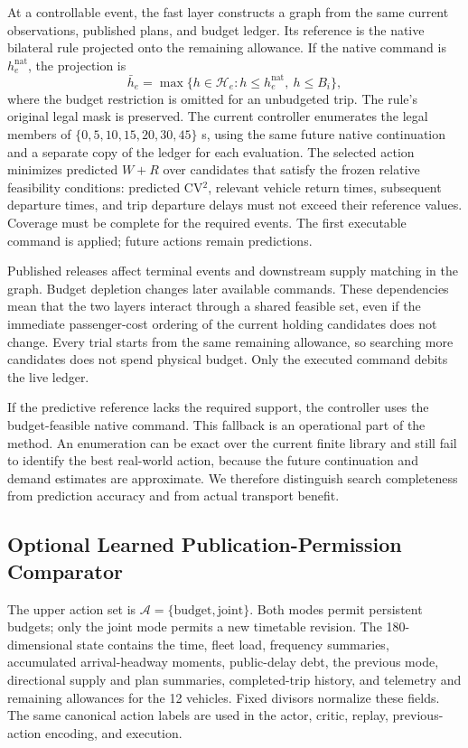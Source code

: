 At a controllable event, the fast layer constructs a graph from the same current observations, published plans, and budget ledger. Its reference is the native bilateral rule projected onto the remaining allowance. If the native command is $h_e^{\mathrm{nat}}$, the projection is
\begin{equation}
 \bar h_e=\max\{h\in\mathcal H_e:h\leq h_e^{\mathrm{nat}},\ h\leq B_i\},
 \label{eq:projection}
\end{equation}
where the budget restriction is omitted for an unbudgeted trip. The rule's original legal mask is preserved. The current controller enumerates the legal members of $\{0,5,10,15,20,30,45\}$ s, using the same future native continuation and a separate copy of the ledger for each evaluation. The selected action minimizes predicted $W+R$ over candidates that satisfy the frozen relative feasibility conditions: predicted CV$^2$, relevant vehicle return times, subsequent departure times, and trip departure delays must not exceed their reference values. Coverage must be complete for the required events. The first executable command is applied; future actions remain predictions.

Published releases affect terminal events and downstream supply matching in the graph. Budget depletion changes later available commands. These dependencies mean that the two layers interact through a shared feasible set, even if the immediate passenger-cost ordering of the current holding candidates does not change. Every trial starts from the same remaining allowance, so searching more candidates does not spend physical budget. Only the executed command debits the live ledger.

If the predictive reference lacks the required support, the controller uses the budget-feasible native command. This fallback is an operational part of the method. An enumeration can be exact over the current finite library and still fail to identify the best real-world action, because the future continuation and demand estimates are approximate. We therefore distinguish search completeness from prediction accuracy and from actual transport benefit.

\subsection{Optional Learned Publication-Permission Comparator}
The upper action set is $\mathcal A=\{\mathrm{budget},\mathrm{joint}\}$. Both modes permit persistent budgets; only the joint mode permits a new timetable revision. The 180-dimensional state contains the time, fleet load, frequency summaries, accumulated arrival-headway moments, public-delay debt, the previous mode, directional supply and plan summaries, completed-trip history, and telemetry and remaining allowances for the 12 vehicles. Fixed divisors normalize these fields. The same canonical action labels are used in the actor, critic, replay, previous-action encoding, and execution.

